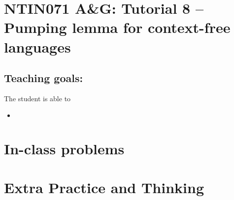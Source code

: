 \documentclass[a4paper,12pt]{amsart}
\begin{document}
\thispagestyle{empty}

\section*{NTIN071 A\&G: Tutorial 8 -- Pumping lemma for context-free languages}

\medskip

\subsection*{Teaching goals:} The student is able to

    \begin{itemize}\setlength{\itemsep}{0pt}
        \item 
    \end{itemize}


\section*{In-class problems}


\medskip\begin{problem}

\end{problem}


\section*{Extra Practice and Thinking}


\medskip\begin{problem}

\end{problem}
\end{document}
